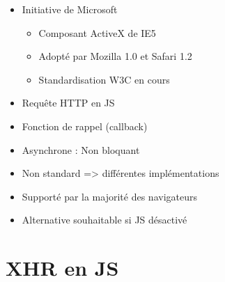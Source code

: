 \begin{itemize}
\tightlist
\item
  Initiative de Microsoft

  \begin{itemize}
  \tightlist
  \item
    Composant ActiveX de IE5
  \item
    Adopté par Mozilla 1.0 et Safari 1.2
  \item
    Standardisation W3C en cours
  \end{itemize}
\item
  Requête HTTP en JS
\item
  Fonction de rappel (callback)
\item
  Asynchrone : Non bloquant
\item
  Non standard =\textgreater{} différentes implémentations
\item
  Supporté par la majorité des navigateurs
\item
  Alternative souhaitable si JS désactivé
\end{itemize}

\hypertarget{xhr-en-js}{%
\section{XHR en JS}\label{xhr-en-js}}

\begin{english}

\begin{Shaded}
\begin{Highlighting}[]
\OperatorTok{;}
 \NormalTok{() }
\NormalTok{\{}
    \NormalTok{ (}\NormalTok{) }
\NormalTok{    \{}
\OperatorTok{=}  \NormalTok{(}\NormalTok{)}\OperatorTok{;}
\NormalTok{    \}}
     \NormalTok{ (}\NormalTok{) }
\NormalTok{    \{}
\OperatorTok{=}  \NormalTok{()}\OperatorTok{;}
\NormalTok{    \}}
\NormalTok{\}}
\end{Highlighting}
\end{Shaded}

\end{english}

